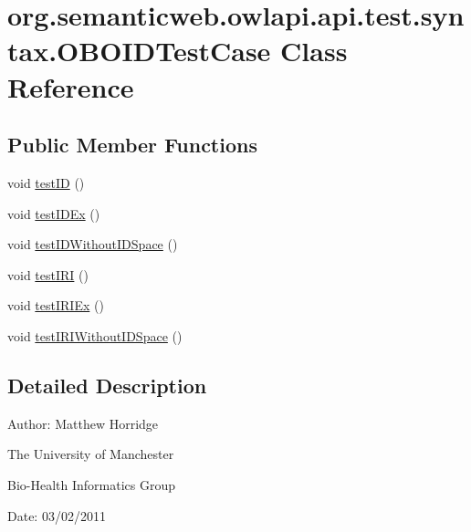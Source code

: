 \hypertarget{classorg_1_1semanticweb_1_1owlapi_1_1api_1_1test_1_1syntax_1_1_o_b_o_i_d_test_case}{\section{org.\-semanticweb.\-owlapi.\-api.\-test.\-syntax.\-O\-B\-O\-I\-D\-Test\-Case Class Reference}
\label{classorg_1_1semanticweb_1_1owlapi_1_1api_1_1test_1_1syntax_1_1_o_b_o_i_d_test_case}
}
\subsection*{Public Member Functions}
\begin{DoxyCompactItemize}
\item 
void \hyperlink{classorg_1_1semanticweb_1_1owlapi_1_1api_1_1test_1_1syntax_1_1_o_b_o_i_d_test_case_a4f1791335cb4a07e4fa17712fc27f93c}{test\-I\-D} ()
\item 
void \hyperlink{classorg_1_1semanticweb_1_1owlapi_1_1api_1_1test_1_1syntax_1_1_o_b_o_i_d_test_case_a0e12b9f379b4ffb45a79d57d8fec7e34}{test\-I\-D\-Ex} ()
\item 
void \hyperlink{classorg_1_1semanticweb_1_1owlapi_1_1api_1_1test_1_1syntax_1_1_o_b_o_i_d_test_case_a29a9d4ef113bbaa69436df79443a4e80}{test\-I\-D\-Without\-I\-D\-Space} ()
\item 
void \hyperlink{classorg_1_1semanticweb_1_1owlapi_1_1api_1_1test_1_1syntax_1_1_o_b_o_i_d_test_case_a3babd4159a6b29944270c8a524095a5d}{test\-I\-R\-I} ()
\item 
void \hyperlink{classorg_1_1semanticweb_1_1owlapi_1_1api_1_1test_1_1syntax_1_1_o_b_o_i_d_test_case_a235d214a85d442799b53ee57da3f1402}{test\-I\-R\-I\-Ex} ()
\item 
void \hyperlink{classorg_1_1semanticweb_1_1owlapi_1_1api_1_1test_1_1syntax_1_1_o_b_o_i_d_test_case_a1368212b49874c78d72dc4a97aac2da9}{test\-I\-R\-I\-Without\-I\-D\-Space} ()
\end{DoxyCompactItemize}


\subsection{Detailed Description}
Author\-: Matthew Horridge\par
 The University of Manchester\par
 Bio-\/\-Health Informatics Group\par
 Date\-: 03/02/2011 

